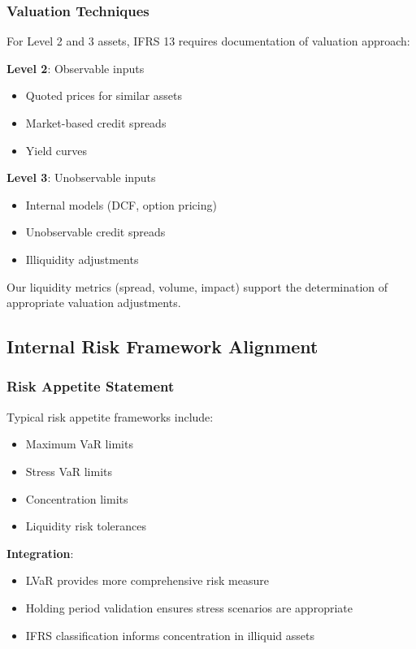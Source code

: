 \documentclass[11pt,a4paper]{article}
\begin{document}
\subsubsection{Valuation Techniques}

For Level 2 and 3 assets, IFRS 13 requires documentation of valuation approach:

\textbf{Level 2}: Observable inputs
\begin{itemize}
    \item Quoted prices for similar assets
    \item Market-based credit spreads
    \item Yield curves
\end{itemize}

\textbf{Level 3}: Unobservable inputs
\begin{itemize}
    \item Internal models (DCF, option pricing)
    \item Unobservable credit spreads
    \item Illiquidity adjustments
\end{itemize}

Our liquidity metrics (spread, volume, impact) support the determination of appropriate valuation adjustments.

\subsection{Internal Risk Framework Alignment}

\subsubsection{Risk Appetite Statement}

Typical risk appetite frameworks include:
\begin{itemize}
    \item Maximum VaR limits
    \item Stress VaR limits
    \item Concentration limits
    \item Liquidity risk tolerances
\end{itemize}

\textbf{Integration}:
\begin{itemize}
    \item LVaR provides more comprehensive risk measure
    \item Holding period validation ensures stress scenarios are appropriate
    \item IFRS classification informs concentration in illiquid assets
\end{itemize}
\end{document}
